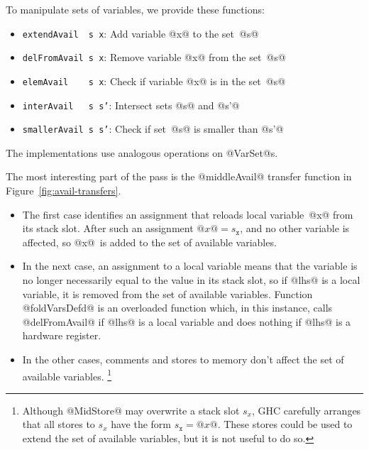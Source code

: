 \documentclass[blockstyle,preprint,nocopyrightspace]{sigplanconf}
\newcommand\slotof[1]{\ensuremath{s_{#1}}}
\newcommand{\authornote}[1]{{\em #1}}
\def\authornote#1{\unskip\relax}
\newcommand{\norman}[1]{\authornote{NR: #1}}
\let\remark\norman
\newcommand{\john}[1]{\authornote{JD: #1}}
\newcommand\figref[1]{Figure~\ref{fig:#1}}
\begin{document}
To manipulate sets of variables, we provide these functions:
\begin{itemize}
\item \texttt{extendAvail~~s~x}: Add variable @x@ to the set~@s@
\item \texttt{delFromAvail~s~x}: Remove variable @x@ from the set~@s@
\item \texttt{elemAvail~~~~s~x}: Check if variable @x@ is in the set~@s@
\item \texttt{interAvail~~~s s'}: Intersect sets @s@ and @s'@
\item \texttt{smallerAvail~s s'}: Check if set~@s@ is smaller than @s'@
\end{itemize}
The implementations use analogous operations on @VarSet@s.




The most interesting part of the pass is the @middleAvail@ transfer
function in \figref{avail-transfers}.
\begin{itemize}
\item
The first case identifies an assignment that reloads local
variable~@x@ from its stack slot.\remark{I propose the compiler be
modified to use @isStackSlotOf@ as I've written. JD~approves.}
After such an assignment $@x@ = \slotof{\mathtt{x}}$, and no other variable
is affected, so @x@~is added to the set of available
variables.\remark{I'm not sure @agen@ and 
@akill@ are helping the exposition.}
\item
In the next case, an assignment to a local variable means that the
variable is no longer necessarily equal to the value in its stack
slot, so if @lhs@ is a local variable, it is removed from the set of
available variables.
Function @foldVarsDefd@ is an overloaded function which, in this
instance, calls @delFromAvail@ if @lhs@ is a local variable and does
nothing if @lhs@ is a hardware register.
\item 
In the other cases, comments and stores to memory don't affect the set
of available variables.
\footnote
{Although @MidStore@ may overwrite a stack slot \slotof x, GHC
carefully arranges that all stores to \slotof x have the form
$\slotof{\mathtt{x}}= @x@$.
These stores could be used to extend the set of available variables,
but it is not useful to do so.}
\remark{How do we know that @MidStore@ doesn't
destroy a stack slot??  I've put in a footnote but it will probably be
simpler to fix the code.}
\end{itemize}
\end{document}

